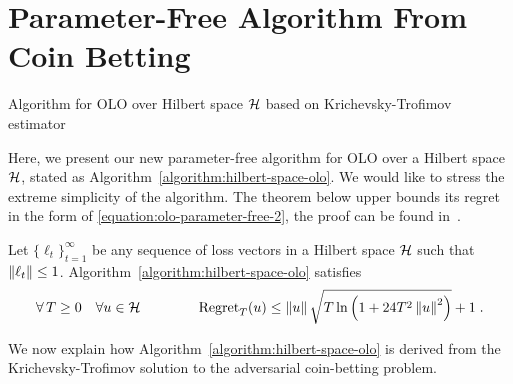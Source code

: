 \section{Parameter-Free Algorithm From Coin Betting}
\label{section:algorithms}

\begin{algorithm}[t]
\caption{Algorithm for OLO over Hilbert space $\mathcal{H}$ based on Krichevsky-Trofimov estimator
\label{algorithm:hilbert-space-olo}}
\begin{algorithmic}[1]
{
\ENDFOR
}
\end{algorithmic}
\end{algorithm}

Here, we present our new parameter-free algorithm for \ac{OLO} over a Hilbert space $\mathcal{H}$, 
stated as Algorithm~\ref{algorithm:hilbert-space-olo}.  We would like to stress the extreme simplicity of the algorithm.
The theorem below upper
bounds its regret in the form of \eqref{equation:olo-parameter-free-2}, the proof can be found
in~\cite{Orabona-Pal-2016-parameter-free}.

\begin{theorem}
\label{theorem:hilbert-space-olo-regret}
Let $\{\ell_t\}_{t=1}^\infty$ be any sequence of loss vectors
in a Hilbert space $\mathcal{H}$ such that $\left\|{\ell_t}\right\| \le 1$.
Algorithm~\ref{algorithm:hilbert-space-olo} satisfies
$$
\forall \, T \ge 0 \quad
\forall u \in \mathcal{H} \qquad \qquad
\operatorname{Regret}_T(u) \le \left\|{u}\right\| \sqrt{T \ln\left(1 + 24T^2 \left\|{u}\right\|^2 \right)} + 1 \;.
$$
\end{theorem}

We now explain how Algorithm~\ref{algorithm:hilbert-space-olo} is derived from the
Krichevsky-Trofimov solution to the adversarial coin-betting problem.


